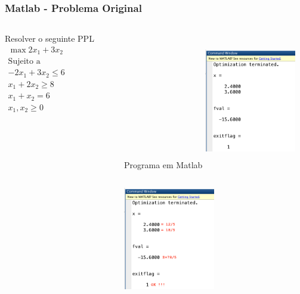 \documentclass{beamer}
\begin{document}
\begin{frame}[fragile]
	\frametitle{Matlab - Problema Original}
	\begin{columns}
		\begin{column}{5cm}
			\begin{block}{Resolver o seguinte PPL}
				\centering
				$
					\begin{matrix}
						\max 2x_1+3x_2 \\
						\text{Sujeito a} \\
						-2x_1+3x_2 \le 6 \\
						x_1 + 2x_2 \ge 8 \\
						x_1 + x_2 = 6 \\
						x_1, x_2 \ge 0 \\
					\end{matrix}
				$
			\end{block}
		\end{column}
		\begin{column}{5cm}
			\begin{block}{Programa em Matlab}
				\only<1>
				{
					\includegraphics[width=4cm,height=6cm]{BigM_Matlab_1.png}
				}
				\only<2>
				{
					\includegraphics[width=4cm,height=6cm]{BigM_Matlab_2.png}
				}
			\end{block}
		\end{column}
	\end{columns}
\end{frame}
\end{document}
